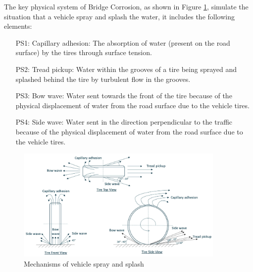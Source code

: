 \documentclass[12pt]{article}
\begin{document}
The key physical system of Bridge Corrosion, as shown in Figure \ref{4mechanism}, simulate the situation that a vehicle spray and splash the water, it includes the following elements:

\begin{itemize}

\item[PS1:] Capillary adhesion: The absorption of water (present on the road surface) by the tires through surface tension.

\item[PS2:] Tread pickup: Water within the grooves of a tire being sprayed and splashed behind the tire by turbulent flow in the grooves.

\item[PS3:] Bow wave: Water sent towards the front of the tire because of the physical displacement of water from the road surface due to the vehicle tires.

\item[PS4:] Side wave: Water sent in the direction perpendicular to the traffic because of the physical displacement of water from the road surface due to the vehicle tires.

\end{itemize}


\begin{figure}[h!]
\begin{center}
\includegraphics[width=0.9\textwidth]{phymodel}
\caption{\label{4mechanism} Mechanisms of vehicle spray and splash}

\end{center}
\end{figure}

\end{document}
